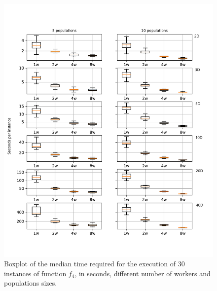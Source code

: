 \documentclass[review]{elsarticle}
\begin{document}
%
\begin{figure}[h!tbp]
  \centering
  \includegraphics[width=\textwidth]{time_diff}
  \caption{Boxplot of the median time required for the execution of 30 
  instances of function $f_4$, in seconds, different number of workers and populations sizes.  }
  \label{fig:spworker:time}
\end{figure}
%
\end{document}
